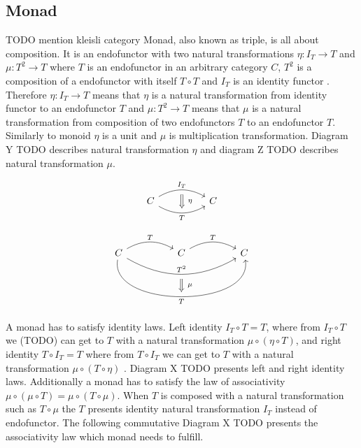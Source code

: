 \documentclass[article]{aaltoseries}
\begin{document}
  \subsection{Monad}
    TODO mention kleisli category
    Monad, also known as triple, is all about composition. It is an endofunctor
    with two natural transformations $\eta : I_T \rightarrow T$ and $\mu : T^2
    \rightarrow T$ where $T$ is an endofunctor in an arbitrary category $C$,
    $T^2$ is a composition of a endofunctor with itself $T \circ T$ and $I_T$ is
    an identity functor \cite{barr1990category, moggi1989computational}.
    Therefore $\eta : I_T \rightarrow T$ means that $\eta$ is a natural
    transformation from identity functor to an endofunctor $T$ and $\mu : T^2
    \rightarrow T$ means that $\mu$ is a natural transformation from composition
    of two endofunctors $T$ to an endofunctor $T$. Similarly to monoid $\eta$ is
    a unit and $\mu$ is multiplication transformation. Diagram Y TODO describes
    natural transformation $\eta$ and diagram Z TODO describes natural
    transformation $\mu$.
    
    \[
      \begin{tikzcd}[column sep=huge]
        C \arrow[r, bend left, "I_T", ""{name=A, below}]
        \arrow[r, bend right, "T"{below}, ""{name=B}]
        & C
        \arrow[Rightarrow, from=A, to=B, "\eta"{right=4}]
      \end{tikzcd}
    \]

    \[
      \begin{tikzcd}[column sep=huge]
        C \arrow[r, bend left, "T"]
        \arrow[rr, bend right=30, "T^2", ""{name=A, below}]
        \arrow[rr, bend right=100, "T"{below}, ""{name=B}]
        & C
        \arrow[r, bend left, "T"]
        & C
        \arrow[Rightarrow, from=A, to=B, "\mu"{right=4}]
      \end{tikzcd}
    \]

    A monad has to satisfy identity laws. Left identity $I_T \circ T = T$, where
    from $I_T \circ T$ we (TODO) can get to $T$ with a natural transformation
    $\mu \circ (\eta \circ T)$, and right identity $T \circ I_T = T$ where from
    $T \circ I_T$ we can get to $T$ with a natural transformation $\mu \circ (T
    \circ \eta)$ \cite{mac2013categories, moggi1989computational}. Diagram X
    TODO presents left and right identity laws. Additionally a monad has to
    satisfy the law of associativity $\mu \circ (\mu \circ T) = \mu \circ (T
    \circ \mu)$. When $T$ is composed with a natural transformation such as $T
    \circ \mu$ the $T$ presents identity natural transformation $I_T$ instead of
    endofunctor. The following commutative Diagram X TODO presents the
    associativity law which monad needs to fulfill.
\end{document}
